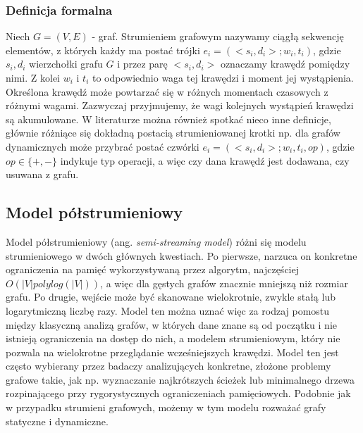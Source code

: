         \subsubsection*{Definicja formalna}
            Niech $G = (V,E)$ - graf. Strumieniem grafowym nazywamy ciągłą sekwencję elementów, z których każdy ma postać trójki $e_i = (<s_i, d_i>; w_i, t_i)$, gdzie $s_i, d_i$ wierzchołki grafu $G$ i przez parę $<s_i, d_i>$ oznaczamy krawędź pomiędzy nimi. Z kolei $w_i$ i $t_i$ to odpowiednio waga tej krawędzi i moment jej wystąpienia. Określona krawędź może powtarzać się w różnych momentach czasowych z różnymi wagami. Zazwyczaj przyjmujemy, że wagi kolejnych wystąpień krawędzi są akumulowane. W literaturze można również spotkać nieco inne definicje, głównie różniące się dokładną postacią strumieniowanej krotki np. dla grafów dynamicznych może przybrać postać czwórki $e_i = (<s_i, d_i>; w_i, t_i, op)$, gdzie $op \in \{+, -\}$ indykuje typ operacji, a więc czy dana krawędź jest dodawana, czy usuwana z grafu\cite{Pacaci_Bonifati_Özsu_2020}.    
        
    \subsection{Model półstrumieniowy}
        Model półstrumieniowy\cite{Feigenbaum_Kannan_McGregor_Suri_Zhang_2005} (ang. \emph{semi-streaming model}) różni się modelu strumieniowego w dwóch głównych kwestiach. Po pierwsze, narzuca on konkretne ograniczenia na pamięć wykorzystywaną przez algorytm, najczęściej $O(|V| polylog(|V|))$, a więc dla gęstych grafów znacznie mniejszą niż rozmiar grafu. Po drugie, wejście może być skanowane wielokrotnie, zwykle stałą lub logarytmiczną liczbę razy. Model ten można uznać więc za rodzaj pomostu między klasyczną analizą grafów, w których dane znane są od początku i nie istnieją ograniczenia na dostęp do nich, a modelem strumieniowym, który nie pozwala na wielokrotne przeglądanie wcześniejszych krawędzi. Model ten jest często wybierany przez badaczy analizujących konkretne, złożone problemy grafowe takie, jak np.  wyznaczanie najkrótszych ścieżek \cite{Elkin_Trehan_2022} lub minimalnego drzewa rozpinającego \cite{Ahn_Guha_McGregor_2012} przy rygorystycznych ograniczeniach pamięciowych. Podobnie jak w przypadku strumieni grafowych, możemy w tym modelu rozważać grafy statyczne i dynamiczne.

